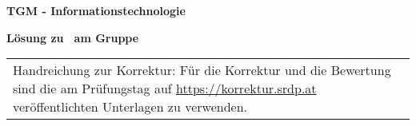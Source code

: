 \documentclass[10pt,a4paper]{article}
\makeatletter
\newcommand{\myID}{\@ID}
\newcommand{\myDate}{\@Date}
\newcommand{\myTitle}{\@Title}
\makeatother
\begin{document}
\thispagestyle{empty}
{\sf
\textbf{\LARGE{TGM - Informationstechnologie}}

\textbf{\large{ Lösung zu \myTitle \, am \myDate \hfill Gruppe \myID}}

\vspace*{2cm}

\begin{tabular}{p{14cm}}
\par{%
Handreichung zur Korrektur:
Für die Korrektur und die Bewertung sind die am Prüfungstag auf \url{https://korrektur.srdp.at} veröffentlichten Unterlagen zu verwenden.

}
\end{tabular}}
\end{document}
